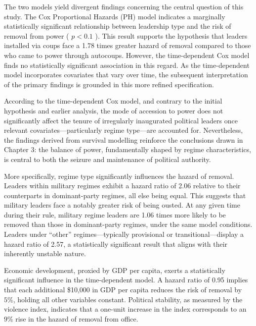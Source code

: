 \documentclass[
  12pt,
]{report}
\begin{document}
The two models yield divergent findings concerning the central question
of this study. The Cox Proportional Hazards (PH) model indicates a
marginally statistically significant relationship between leadership
type and the risk of removal from power ( \(p<0.1\) ). This result
supports the hypothesis that leaders installed via coups face a 1.78
times greater hazard of removal compared to those who came to power
through autocoups. However, the time-dependent Cox model finds no
statistically significant association in this regard. As the
time-dependent model incorporates covariates that vary over time, the
subsequent interpretation of the primary findings is grounded in this
more refined specification.

According to the time-dependent Cox model, and contrary to the initial
hypothesis and earlier analysis, the mode of accession to power does not
significantly affect the tenure of irregularly inaugurated political
leaders once relevant covariates---particularly regime type---are
accounted for. Nevertheless, the findings derived from survival
modelling reinforce the conclusions drawn in Chapter 3: the balance of
power, fundamentally shaped by regime characteristics, is central to
both the seizure and maintenance of political authority.

More specifically, regime type significantly influences the hazard of
removal. Leaders within military regimes exhibit a hazard ratio of 2.06
relative to their counterparts in dominant-party regimes, all else being
equal. This suggests that military leaders face a notably greater risk
of being ousted. At any given time during their rule, military regime
leaders are 1.06 times more likely to be removed than those in
dominant-party regimes, under the same model conditions. Leaders under
``other'' regimes---typically provisional or transitional---display a
hazard ratio of 2.57, a statistically significant result that aligns
with their inherently unstable nature.

Economic development, proxied by GDP per capita, exerts a statistically
significant influence in the time-dependent model. A hazard ratio of
0.95 implies that each additional \$10,000 in GDP per capita reduces the
risk of removal by \(5\%\), holding all other variables constant.
Political stability, as measured by the violence index, indicates that a
one-unit increase in the index corresponds to an \(9\%\) rise in the
hazard of removal from office.
\end{document}
